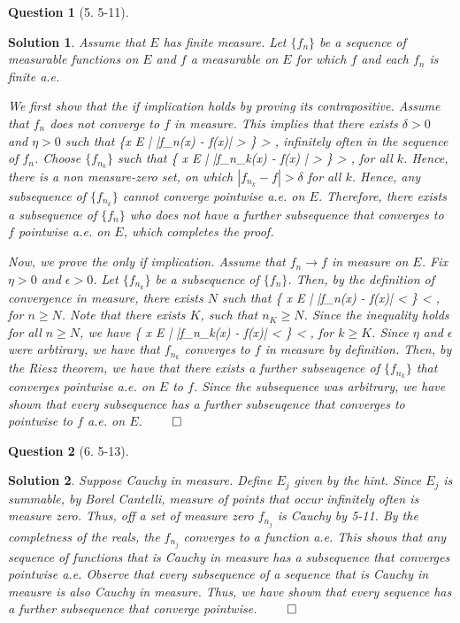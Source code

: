 \documentclass{article} %
\def\eQb#1\eQe{\begin{eqnarray*}#1\end{eqnarray*}}
\theoremstyle{quest}
\newtheorem*{question}{Question}
\newtheorem*{solution}{Solution}
\begin{document}
\begin{question}[5. 5-11]
\end{question}
\begin{solution}
Assume that $E$ has finite measure. Let $\{ f_n \}$ be a sequence of
measurable functions on $E$ and $f$ a measurable on $E$ for which
$f$ and each $f_n$ is finite a.e. 

We first show that the if implication holds by proving its
contrapositive. Assume that $f_n$ does not converge to $f$ in measure. 
This implies that there exists $\delta > 0$ and $\eta > 0$ such that
\eQb
m\{x \in E \> | \> |f_n(x) - f(x)| > \eta \} > \delta,
\eQe
infinitely often in the sequence of $f_n$. Choose $\{ f_{n_k} \}$
such that 
\eQb
m\{ x \in E \> | \> |f_{n_k}(x) - f(x) | > \eta \} > \delta ,
\eQe
for all $k$. Hence, there is a non measure-zero set, on which
$|f_{n_k} - f| > \delta$ for all $k$. Hence, 
any subsequence of $\{ f_{n_k} \}$ cannot 
converge pointwise a.e. on $E$. Therefore, there exists a subsequence
of $\{f_n\}$ who does not have a further subsequence that converges
to $f$ pointwise a.e. on $E$, which completes the proof. 

\smallskip

Now, we prove the only if implication. Assume that $f_n \to f$ in measure
on $E$. Fix $\eta > 0$ and $\epsilon > 0$.
Let $\{ f_{n_k} \}$ be a subsequence of $\{ f_n \}$. 
Then, by the definition of convergence in measure,
there exists $N$ such that
\eQb
m\{ x \in E \> | \> |f_n(x) - f(x)| < \eta \} < \epsilon, 
\eQe
for $n \geq N$. Note that there exists $K$, such that
$n_K \geq N$. Since the inequality holds for all $n \geq N$, we have 
\eQb
m\{ x \in E \> | \> |f_{n_k}(x) - f(x)| < \eta \} < \epsilon, 
\eQe
for $k \geq K$. Since $\eta$ and $\epsilon$ were arbtirary, 
we have that $f_{n_k}$ converges to $f$ in measure by definition.
Then, by the Riesz theorem, we have
that there exists a further subseuqence of $\{ f_{n_k} \}$ that converges
pointwise a.e. on $E$ to $f$.
Since the subsequence was arbitrary, we have shown that 
every subsequence has a further subseuqence that converges to pointwise
to $f$
a.e. on $E$. $\qed$

\end{solution}

\bigskip

\begin{question}[6. 5-13]
\end{question}
\begin{solution}
Suppose Cauchy in measure. Define $E_j$ given by the hint. 
Since $E_j$ is summable, by Borel Cantelli, measure of points
that occur infinitely often is measure zero. Thus, off a set of measure
zero $f_{n_j}$ is Cauchy by 5-11. By the completness of the reals,
the $f_{n_j}$ converges to a function a.e.
This shows that any sequence of functions that is Cauchy in measure
has a subsequence that converges pointwise a.e. Observe that
every subsequence of a sequence that is Cauchy in meausre is also
Cauchy in measure. Thus, we have shown that
every sequence has a further subsequence that converge pointwise.
$\qed$ 
\end{solution}
\end{document}
